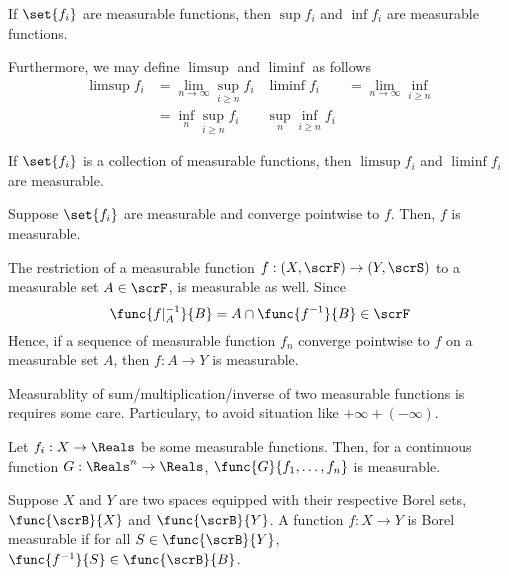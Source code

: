 \begin{theorem}
    If \(\set{f_i}\) are measurable functions, then \(\sup f_i\) and \(\inf f_i\) are measurable functions.
\end{theorem}

Furthermore, we may define \(\limsup\) and \(\liminf\) as follows
\begin{align*}
    \limsup f_i &= \lim_{n \to \infty} \sup_{i \geq n} f_i & \liminf f_i &= \lim_{n \to \infty} \inf_{i \geq n}\\
    &= \inf_n \sup_{i \geq n} f_i & \sup_n \inf_{i \geq n } f_i    
\end{align*}
\begin{corollary}
    If \(\set{f_i}\) is a collection of measurable functions, then \(\limsup f_i\) and \(\liminf f_i\) are measurable. 
\end{corollary}

\begin{corollary}
    Suppose \(\set{f_i}\) are measurable and converge pointwise to \(f\). Then, \(f\) is measurable.
\end{corollary}

\begin{remark}
    The restriction of a measurable function \(f:(X,\scrF)\to(Y,\scrS)\) to a measurable set \(A \in \scrF\), is measurable as well. Since 
    \begin{equation*}
        \func{f|_A^{-1}}{B} = A \cap \func{f^{-1}}{B} \in \scrF
    \end{equation*}
    Hence, if a sequence of measurable function \(f_n\) converge pointwise to \( f\) on a measurable set \(A\), then \(f:A \to Y\) is measurable.
\end{remark}

Measurablity of sum/multiplication/inverse of two measurable functions is requires some care. Particulary, to avoid situation like \(+\infty + (- \infty)\).

\begin{theorem}
    Let \(f_i : X \to \Reals\) be some measurable functions. Then, for a continuous function \(G:\Reals^n \to \Reals\), \(\func{G}{f_1, \dots , f_n}\) is measurable. 
\end{theorem}

\begin{definition}
    Suppose \(X\) and \(Y\) are two spaces equipped with their respective Borel sets, \(\func{\scrB}{X}\) and \(\func{\scrB}{Y}\). A function \(f:X \to Y\) is Borel measurable if for all \(S \in \func{\scrB}{Y}\), \(\func{f^{-1}}{S} \in \func{\scrB}{B}\).
\end{definition}

